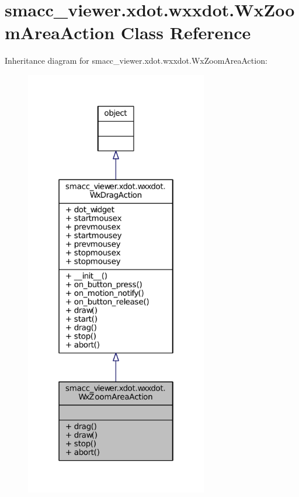 \hypertarget{classsmacc__viewer_1_1xdot_1_1wxxdot_1_1WxZoomAreaAction}{}\section{smacc\+\_\+viewer.\+xdot.\+wxxdot.\+Wx\+Zoom\+Area\+Action Class Reference}
\label{classsmacc__viewer_1_1xdot_1_1wxxdot_1_1WxZoomAreaAction}


Inheritance diagram for smacc\+\_\+viewer.\+xdot.\+wxxdot.\+Wx\+Zoom\+Area\+Action\+:
\nopagebreak
\begin{figure}[H]
\begin{center}
\leavevmode
\includegraphics[width=226pt]{classsmacc__viewer_1_1xdot_1_1wxxdot_1_1WxZoomAreaAction__inherit__graph}
\end{center}
\end{figure}


